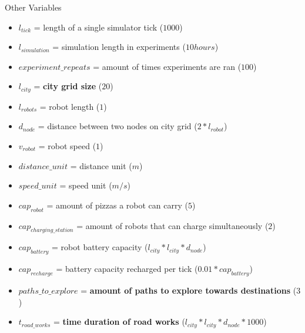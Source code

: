 \begin{frame}[allowframebreaks]{Other Variables} %
    \begin{itemize}
        \item $l_{tick}$ = length of a single simulator tick {\tiny($1000$)}
        \item $l_{simulation}$ = simulation length in experiments {\tiny($10 hours$)}
        \item $experiment\_repeats$ = amount of times experiments are ran {\tiny($100$)}
        \item $l_{city}$ = \textbf{city grid size} {\tiny($20$)}
        \item $l_{robots}$ = robot length {\tiny($1$)}
        \item $d_{node}$ = distance between two nodes on city grid {\tiny($2 * l_{robot}$)}
        \item $v_{robot}$ = robot speed {\tiny($1$)}
        \item $distance\_unit$ = distance unit {\tiny($m$)}
        \item $speed\_unit$ = speed unit {\tiny($m/s$)}

        \framebreak

        \item $cap_{robot}$ = amount of pizzas a robot can carry {\tiny($5$)}
        \item $cap_{charging\_station}$ = amount of robots that can charge simultaneously {\tiny($2$)}
        \item $cap_{battery}$ = robot battery capacity {\tiny($l_{city} * l_{city} * d_{node}$)}
        \item $cap_{recharge}$ = battery capacity recharged per tick {\tiny($0.01 * cap_{battery}$)}
        \item $paths\_to\_explore$ = \textbf{amount of paths to explore towards destinations} {\tiny($3$)}
        \item $t_{road\_works}$ = \textbf{time duration of road works} {\tiny($l_{city} * l_{city} * d_{node} * 1000$)}

        \framebreak


\end{itemize}
\end{frame}
